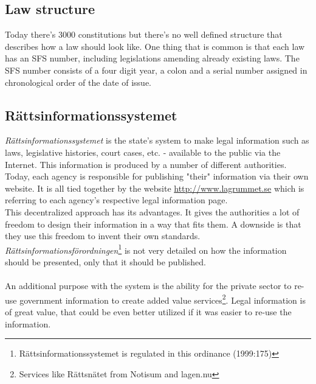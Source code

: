 \subsection{Law structure}
Today there's 3000 constitutions but there's no well defined structure that describes how a law should look like. One thing that is common is that each law has an SFS number, including legislations amending already existing laws. The SFS number consists of a four digit year, a colon and a serial number assigned in chronological order of the date of issue. 

\subsection{Rättsinformationssystemet}
\textit{Rättsinformationssystemet} is the state's system to make legal information such as laws, legislative histories, court cases, etc. - available to the public via the Internet. This information is produced by a number of different authorities. Today, each agency is responsible for publishing "their" information via their own website. It is all tied together by the website \url{http://www.lagrummet.se} which is referring to each agency's respective legal information page.\\
This decentralized approach has its advantages. It gives the authorities a lot of freedom to design their information in a way that fits them. A downside is that they use this freedom to invent their own standards. \textit{Rättsinformationsförordningen}\footnote{Rättsinformationssystemet is regulated in this ordinance (1999:175)} is not very detailed on how the information should be presented, only that it should be published.\\\\
An additional purpose with the system is the ability for the private sector to re-use government information to create added value services\footnote{Services like Rättsnätet from Notisum and lagen.nu}. Legal information is of great value, that could be even better utilized if it was easier to re-use the information.